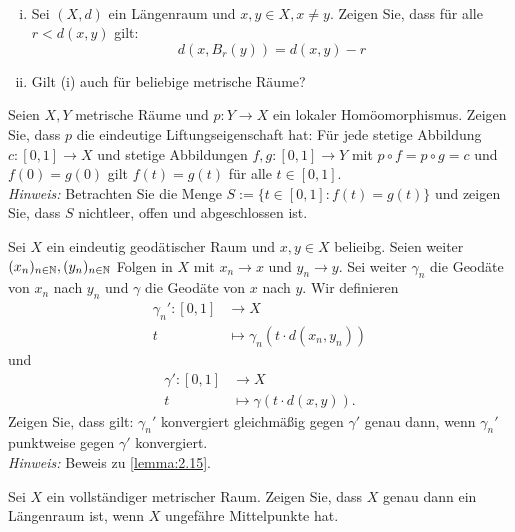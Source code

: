 	\begin{aufgabe}
		\label{aufg:5.1}	
		\mbox{} \\[-1.4cm]
		\begin{enumerate}[(i)]
			\item Sei $(X,d)$ ein Längenraum und $x,y \in X, x \neq y$.
			Zeigen Sie, dass für alle $r < d(x,y)$ gilt:
			\[
				d(x,B_r(y)) = d(x,y) - r
			\]
			\item Gilt (i) auch für beliebige metrische Räume?
		\end{enumerate}
	\end{aufgabe}
	
	\begin{aufgabe}
		\label{aufg:5.2}	
		Seien $X,Y$ metrische Räume und $p \colon Y \rightarrow X$ ein lokaler Homöomorphismus.
		Zeigen Sie, dass $p$ die eindeutige Liftungseigenschaft hat:
		Für jede stetige Abbildung $c \colon [0,1] \rightarrow X$ und stetige Abbildungen $f,g \colon [0,1] \rightarrow Y$ mit $p \circ f = p \circ g = c$ und $f(0) = g(0)$ gilt $f(t) = g(t)$ für alle $t \in [0,1]$. \\
		\textit{Hinweis:} Betrachten Sie die Menge $S:= \{t \in [0,1] : f(t) = g(t)\}$ und zeigen Sie, dass $S$ nichtleer, offen und abgeschlossen ist.
	\end{aufgabe}
	
	\begin{aufgabe}
		\label{aufg:5.3}	
		Sei $X$ ein eindeutig geodätischer Raum und $x,y \in X$ belieibg.
		Seien weiter $(x_n)_{n \in \mathbb{N}}, (y_n)_{n \in \mathbb{N}}$ Folgen in $X$ mit $x_n \rightarrow x$ und $y_n \rightarrow y$.
		Sei weiter $\gamma_n$ die Geodäte von $x_n$ nach $y_n$ und $\gamma$ die Geodäte von $x$ nach $y$.
		Wir definieren
		\begin{align*}
			\gamma_n'\colon [0,1] &\longrightarrow X \\
			t &\longmapsto \gamma_n(t \cdot d(x_n,y_n))
		\end{align*}
		und
		\begin{align*}
			\gamma'\colon [0,1] &\longrightarrow X \\
			t &\longmapsto \gamma(t \cdot d(x,y)).
		\end{align*}
		Zeigen Sie, dass gilt:
		$\gamma_n'$ konvergiert gleichmäßig gegen $\gamma'$ genau dann, wenn $\gamma_n'$ punktweise gegen $\gamma'$ konvergiert. \\
		\textit{Hinweis:} Beweis zu \autoref{lemma:2.15}.
	\end{aufgabe}

	\begin{aufgabe}
		\label{aufg:5.4}	
		Sei $X$ ein vollständiger metrischer Raum.
		Zeigen Sie, dass $X$ genau dann ein Längenraum ist, wenn $X$ ungefähre Mittelpunkte hat.
	\end{aufgabe}
	
